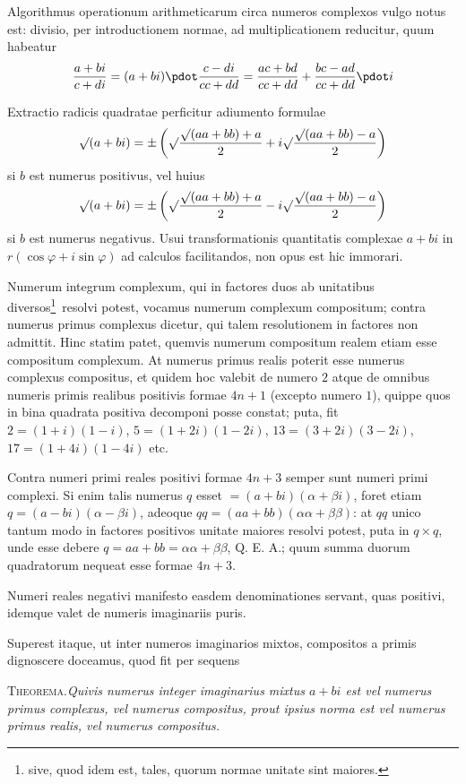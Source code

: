 %
Algorithmus operationum arithmeticarum circa numeros complexos vulgo notus est: divisio, per introductionem normae, ad multiplicationem reducitur, quum habeatur
\[
\frac{a+bi}{c+di}=(a+bi)\pdot\frac{c-di}{cc+dd}=\frac{ac+bd}{cc+dd}+\frac{bc-ad}{cc+dd}\pdot i
\]

Extractio radicis quadratae perficitur adiumento formulae
\[
\surd(a+bi)=\pm\left(\surd\frac{\surd(aa+bb)+a}{2}+i\surd\frac{\surd(aa+bb)-a}{2}\right)
\]
si $b$ est numerus positivus, vel huius
\[
\surd(a+bi)=\pm\left(\surd\frac{\surd(aa+bb)+a}{2}-i\surd\frac{\surd(aa+bb)-a}{2}\right)
\]
si $b$ est numerus negativus. Usui transformationis quantitatis complexae $a+bi$ in $r(\cos\varphi+i\sin\varphi)$ ad calculos facilitandos, non opus est hic immorari.

Numerum integrum complexum, qui in factores duos ab unitatibus diversos\begingroup\renewcommand{\thefootnote}{*)}\footnote{sive, quod idem est, tales, quorum normae unitate sint maiores.}\endgroup\ resolvi potest, vocamus numerum complexum compositum; contra numerus primus complexus dicetur, qui talem resolutionem in factores non admittit. Hinc statim patet, quemvis numerum compositum realem etiam esse compositum complexum. At numerus primus realis poterit esse numerus complexus compositus, et quidem hoc valebit de numero $2$ atque de omnibus numeris primis realibus positivis formae $4n+1$ (excepto numero $1$), quippe quos in bina quadrata positiva decomponi posse constat; puta, fit $2=(1+i)(1-i)$, $5=(1+2i)(1-2i)$, $13=(3+2i)(3-2i)$, $17=(1+4i)(1-4i)$ etc.

Contra numeri primi reales positivi formae $4n+3$ semper sunt numeri primi complexi. Si enim talis numerus $q$ esset $=(a+bi)(\alpha+\beta i)$, foret etiam $q=(a-bi)(\alpha-\beta i)$, adeoque $qq=(aa+bb)(\alpha\alpha+\beta\beta)$: at $qq$ unico tantum modo in factores positivos unitate maiores resolvi potest, puta in $q\times q$, unde esse debere $q=aa+bb=\alpha\alpha+\beta\beta$, Q. E. A.; quum summa duorum quadratorum nequeat esse formae $4n+3$.

%
Numeri reales negativi manifesto easdem denominationes servant, quas positivi, idemque valet de numeris imaginariis puris.

Superest itaque, ut inter numeros imaginarios mixtos, compositos a primis dignoscere doceamus, quod fit per sequens

\textsc{Theorema.}\quad\emph{Quivis numerus integer imaginarius mixtus $a+bi$ est vel numerus primus complexus, vel numerus compositus, prout ipsius norma est vel numerus primus realis, vel numerus compositus.}

